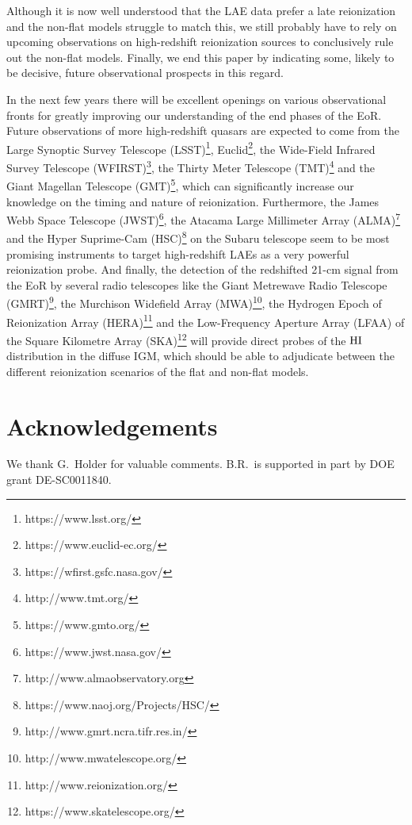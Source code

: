 \documentclass[useAMS,usenatbib]{mnras}
\begin{document}
Although it is now well understood that the LAE data prefer a late reionization
\citep{2015MNRAS.446..566M,2015MNRAS.452..261C} and the non-flat models 
struggle to match this, we still probably have to rely on upcoming 
observations on high-redshift reionization sources to conclusively
rule out the non-flat models. Finally, we end this paper by indicating 
some, likely to be decisive, future observational prospects in this regard.

In the next few years there will be excellent openings on various 
observational fronts for greatly improving our understanding of the end phases 
of the EoR. Future observations of more high-redshift quasars are expected
to come from the Large Synoptic Survey Telescope (LSST)\footnote{https://www.lsst.org/},
Euclid\footnote{https://www.euclid-ec.org/}, the Wide-Field Infrared 
Survey Telescope (WFIRST)\footnote{https://wfirst.gsfc.nasa.gov/}, the Thirty 
Meter Telescope (TMT)\footnote{http://www.tmt.org/} and the Giant Magellan 
Telescope (GMT)\footnote{https://www.gmto.org/}, which can significantly 
increase our knowledge on the timing and nature of reionization. Furthermore, 
the James Webb Space Telescope (JWST)\footnote{https://www.jwst.nasa.gov/}, 
the Atacama Large Millimeter Array (ALMA)\footnote{http://www.almaobservatory.org}
and the Hyper Suprime-Cam (HSC)\footnote{https://www.naoj.org/Projects/HSC/} 
on the Subaru telescope seem to be most promising instruments to target 
high-redshift LAEs as a very powerful reionization probe. And finally,
the detection of the redshifted 21-cm signal from the EoR by several radio 
telescopes like the Giant Metrewave Radio Telescope
(GMRT)\footnote{http://www.gmrt.ncra.tifr.res.in/}, the Murchison Widefield Array
(MWA)\footnote{http://www.mwatelescope.org/}, the Hydrogen Epoch of Reionization Array
(HERA)\footnote{http://www.reionization.org/} and the Low-Frequency Aperture Array
(LFAA) of the Square Kilometre Array (SKA)\footnote{https://www.skatelescope.org/}
will provide direct probes of the ${\rm HI}$ distribution in the diffuse 
IGM, which should be able to adjudicate between the different
reionization scenarios of the flat and non-flat models.

\section*{Acknowledgements}

We thank G.\ Holder for valuable comments. B.R.\ is supported
in part by DOE grant DE-SC0011840.




\end{document}
